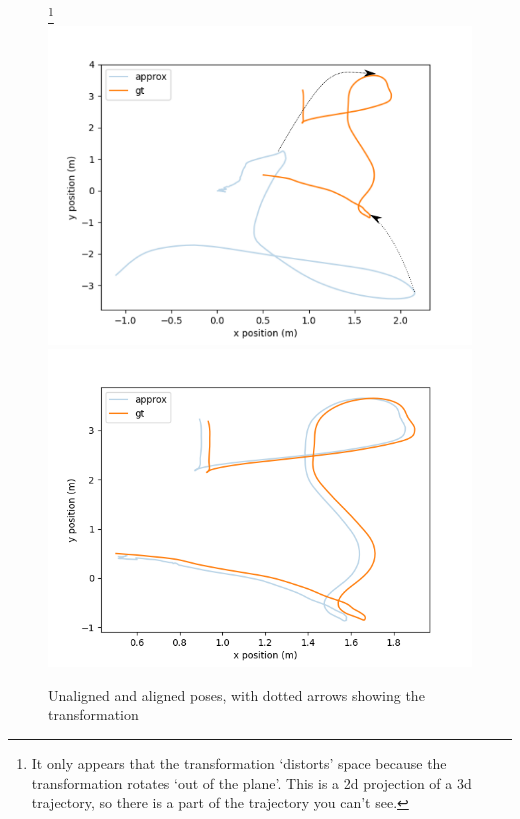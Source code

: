 \begin{figure}[H]
  \label{transformation}
  \caption{Unaligned and aligned poses, with dotted arrows showing the transformation}
  \footnote{It only appears that the transformation `distorts' space because the transformation rotates `out of the plane'. This is a 2d projection of a 3d trajectory, so there is a part of the trajectory you can't see.}
  \includegraphics[width=\columnwidth]{unaligned.png}
  \includegraphics[width=\columnwidth]{aligned.png}
\end{figure}

